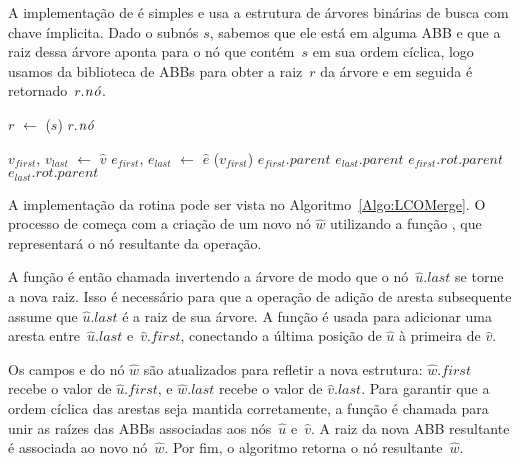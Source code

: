 A implementação de \LCOFindNode{} é simples e usa a estrutura de árvores binárias de busca com chave ímplicita.
Dado o subnós $s$, sabemos que ele está em alguma ABB e que a raiz dessa árvore aponta para o nó que contém~$s$ em sua ordem cíclica, logo usamos \treapGetRoot{} da biblioteca de ABBs para obter a raiz~$r$ da árvore e em seguida é retornado~$r$.$\mathit{n\acute{o}}$.

\begin{algorithm}[htb]
\caption{\LCOFindNode($s$)}
\label{Algo:LCOFindNode}
\begin{algorithmic}[1]
\State $r$ $\gets$ \treapGetRoot($s$)
\State \Return $r$.$\mathit{n\acute{o}}$
\end{algorithmic}
\end{algorithm}




\begin{algorithm}[htb]
\caption{\LCOFindSubNode($\hat v$, $\hat e$)}
\label{Algo:LCOFindSubNode}
\begin{algorithmic}[1]
\State $v_{first}$, $v_{last}$ $\gets$ $\hat v$
\State $e_{first}$, $e_{last}$ $\gets$ $\hat e$
\State \linkcutEvert($v_{first}$)
\State \Return $e_{first}$.$parent$
\EndIf
\State \Return $e_{last}$.$parent$
\Else
{}
\State \Return $e_{first}.rot.parent$
\Else
\State \Return $e_{last}.rot.parent$
\EndIf
\EndIf
\end{algorithmic}
\end{algorithm}


A implementação da rotina \LCOMerge pode ser vista no Algoritmo~\ref{Algo:LCOMerge}.
O processo de \LCOMerge{} começa com a criação de um novo nó $\hat w$ utilizando a função \LCOMakeNode, que representará o nó resultante da operação.

A função \linkcutEvert{} é então chamada invertendo a árvore de modo que o nó~$\hat u$.$last$ se torne a nova raiz.
Isso é necessário para que a operação \linkcutAddEdge de adição de aresta subsequente assume que $\hat u$.$last$ é a raiz de sua árvore.
A função \linkcutAddEdge é usada para adicionar uma aresta entre~$\hat u$.$last$ e~$\hat v$.$first$, conectando a última posição de $\hat u$ à primeira de $\hat v$.

Os campos  e  do nó $\hat w$ são atualizados para refletir a nova estrutura: $\hat w$.$first$ recebe o valor de $\hat u$.$first$, e $\hat w$.$last$ recebe o valor de $\hat v$.$last$. Para garantir que a ordem cíclica das arestas seja mantida corretamente, a função \treapJoin{} é chamada para unir as raízes das ABBs associadas aos nós~$\hat u$ e~$\hat v$. A raiz da nova ABB resultante é associada ao novo nó~$\hat w$.
Por fim, o algoritmo retorna o nó resultante~$\hat w$.

